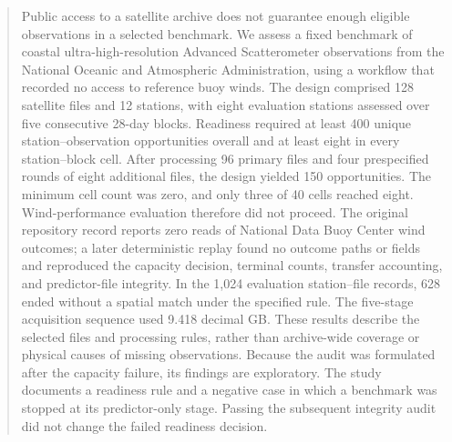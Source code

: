 \begin{abstract}
Public access to a satellite archive does not guarantee enough eligible observations in a selected benchmark. We assess a fixed benchmark of coastal ultra-high-resolution Advanced Scatterometer observations from the National Oceanic and Atmospheric Administration, using a workflow that recorded no access to reference buoy winds. The design comprised 128 satellite files and 12 stations, with eight evaluation stations assessed over five consecutive 28-day blocks. Readiness required at least 400 unique station--observation opportunities overall and at least eight in every station--block cell. After processing 96 primary files and four prespecified rounds of eight additional files, the design yielded 150 opportunities. The minimum cell count was zero, and only three of 40 cells reached eight. Wind-performance evaluation therefore did not proceed. The original repository record reports zero reads of National Data Buoy Center wind outcomes; a later deterministic replay found no outcome paths or fields and reproduced the capacity decision, terminal counts, transfer accounting, and predictor-file integrity. In the 1,024 evaluation station--file records, 628 ended without a spatial match under the specified rule. The five-stage acquisition sequence used 9.418 decimal GB. These results describe the selected files and processing rules, rather than archive-wide coverage or physical causes of missing observations. Because the audit was formulated after the capacity failure, its findings are exploratory. The study documents a readiness rule and a negative case in which a benchmark was stopped at its predictor-only stage. Passing the subsequent integrity audit did not change the failed readiness decision.
\end{abstract}

